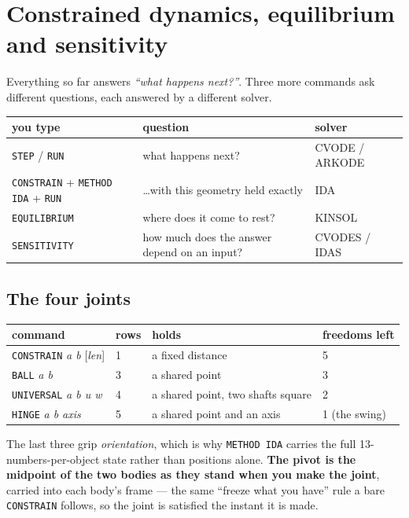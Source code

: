 \documentclass[11pt]{article}
\newcommand{\kw}[1]{\texttt{\uppercase{#1}}}
\begin{document}
\section{Constrained dynamics, equilibrium and sensitivity}

Everything so far answers \emph{``what happens next?''}. Three more
commands ask different questions, each answered by a different solver.

\begin{center}
\begin{tabular}{p{5.4cm}p{5.6cm}p{2.8cm}}
\textbf{you type} & \textbf{question} & \textbf{solver}\\\hline
\kw{step} / \kw{run} & what happens next? & CVODE / ARKODE\\
\kw{constrain} + \kw{method ida} + \kw{run} & \dots with this geometry held exactly & IDA\\
\kw{equilibrium} & where does it come to rest? & KINSOL\\
\kw{sensitivity} & how much does the answer depend on an input? & CVODES / IDAS\\
\end{tabular}
\end{center}

\subsection{The four joints}

\begin{center}
\begin{tabular}{p{4.6cm}p{1.2cm}p{4.4cm}p{3.4cm}}
\textbf{command} & \textbf{rows} & \textbf{holds} & \textbf{freedoms left}\\\hline
\kw{constrain} \emph{a b} [\emph{len}] & 1 & a fixed distance & 5\\
\kw{ball} \emph{a b} & 3 & a shared point & 3\\
\kw{universal} \emph{a b u w} & 4 & a shared point, two shafts square & 2\\
\kw{hinge} \emph{a b axis} & 5 & a shared point and an axis & 1 (the swing)\\
\end{tabular}
\end{center}

The last three grip \emph{orientation}, which is why \kw{method ida}
carries the full 13-numbers-per-object state rather than positions
alone. \textbf{The pivot is the midpoint of the two bodies as they stand
when you make the joint}, carried into each body's frame --- the same
``freeze what you have'' rule a bare \kw{constrain} follows, so the joint
is satisfied the instant it is made.
\end{document}
